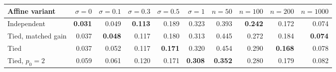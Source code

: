 \begin{tabular}{lrrrrrrrrr}
\toprule
Affine variant & $\sigma=0$ & $\sigma=0.1$ & $\sigma=0.3$ & $\sigma=0.5$ & $\sigma=1$ & $n=50$ & $n=100$ & $n=200$ & $n=1000$ \\
\midrule
Independent & \textbf{0.031} & 0.049 & \textbf{0.113} & 0.189 & 0.323 & 0.393 & \textbf{0.242} & 0.172 & 0.074 \\
Tied, matched gain & 0.037 & \textbf{0.048} & 0.117 & 0.180 & 0.313 & 0.445 & 0.272 & 0.184 & \textbf{0.074} \\
Tied & 0.037 & 0.052 & 0.117 & \textbf{0.171} & 0.320 & 0.454 & 0.290 & \textbf{0.168} & 0.078 \\
Tied, $p_0=2$ & 0.059 & 0.061 & 0.120 & 0.171 & \textbf{0.308} & \textbf{0.352} & 0.280 & 0.179 & 0.082 \\
\bottomrule\end{tabular}
